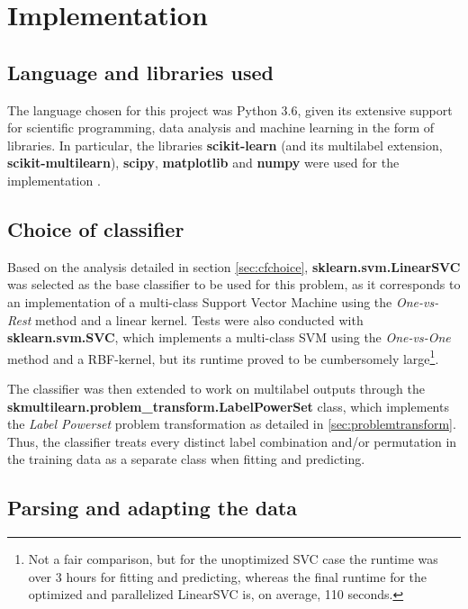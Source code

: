 \documentclass{kthreport}
\theoremstyle{definition}
\begin{document}
\section{Implementation}

\subsection{Language and libraries used}

The language chosen for this project was Python 3.6, given its extensive support for scientific programming, data analysis and machine learning in the form of libraries. In particular, the libraries \textbf{scikit-learn} (and its multilabel extension, \textbf{scikit-multilearn}), \textbf{scipy}, \textbf{matplotlib} and \textbf{numpy} were used for the implementation \autocite{scikit-learn,scikit-multilearn,scipy,matplotlib,numpy}.

\subsection{Choice of classifier}

Based on the analysis detailed in section \ref{sec:cfchoice}, \textbf{sklearn.svm.LinearSVC} was selected as the base classifier to be used for this problem, as it corresponds to an implementation of a multi-class Support Vector Machine using the \emph{One-vs-Rest} method and a linear kernel. Tests were also conducted with \textbf{sklearn.svm.SVC}, which implements a multi-class SVM using the \emph{One-vs-One} method and a RBF-kernel, but its runtime proved to be cumbersomely large\footnote{Not a fair comparison, but for the unoptimized SVC case the runtime was over \num{3} hours for fitting and predicting, whereas the final runtime for the optimized and parallelized LinearSVC is, on average, \num{110} seconds.}.

The classifier was then extended to work on multilabel outputs through the \textbf{skmultilearn.problem\_transform.LabelPowerSet} class, which implements the \emph{Label Powerset} problem transformation as detailed in \ref{sec:problemtransform}. 
Thus, the classifier treats every distinct label combination and/or permutation in the training data as a separate class when fitting and predicting.

\subsection{Parsing and adapting the data}\label{sec:parsing}
\end{document}
